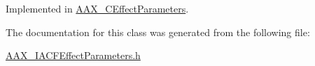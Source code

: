 Implemented in \hyperlink{a00018_ab3ae4c63bed249f30ee21df29d0cba6d}{A\+A\+X\+\_\+\+C\+Effect\+Parameters}.



The documentation for this class was generated from the following file\+:\begin{DoxyCompactItemize}
\item 
\hyperlink{a00224}{A\+A\+X\+\_\+\+I\+A\+C\+F\+Effect\+Parameters.\+h}\end{DoxyCompactItemize}
